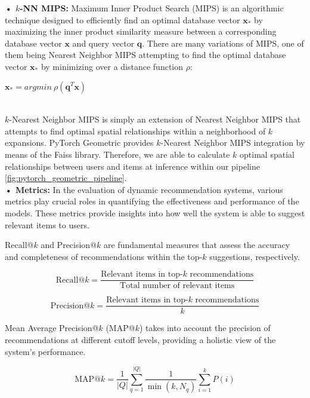 \documentclass[bst/sn-nature]{sn-jnl}
\begin{document}
\begin{multicols}{2}
\textbf{• $k$-NN MIPS:} Maximum Inner Product Search (MIPS) is an algorithmic technique designed to efficiently find an optimal database vector $\mathbf{x_{*}}$ by maximizing the inner product similarity measure between a corresponding database vector $\mathbf{x}$ and query vector $\mathbf{q}$. There are many variations of MIPS, one of them being Nearest Neighbor MIPS\cite{nnmips1, nnmips2} attempting to find the optimal database vector $\mathbf{x_{*}}$ by minimizing over a distance function $\rho$: \\ 

\begin{center}
    $\mathbf{x_{*}} = argmin \ \rho(\mathbf{q}^T \mathbf{x})$\\~\\
\end{center}

$k$-Nearest Neighbor MIPS\cite{nnmips3} is simply an extension of Nearest Neighbor MIPS that attempts to find optimal spatial relationships within a neighborhood of $k$ expansions.
PyTorch Geometric provides $k$-Nearest Neighbor MIPS\cite{nnmips3} integration by means of the Faiss library\cite{faiss}. Therefore, we are able to calculate $k$ optimal spatial relationships between users and items at inference within our pipeline \ref{fig:pytorch_geometric_pipeline}. \\ 

\textbf{• Metrics:} In the evaluation of dynamic recommendation systems, various metrics play crucial roles in quantifying the effectiveness and performance of the models. These metrics provide insights into how well the system is able to suggest relevant items to users. 

Recall@$k$ and Precision@$k$ are fundamental measures that assess the accuracy and completeness of recommendations within the top-$k$ suggestions, respectively. 

\[
\text{Recall@}k = \frac{\text{Relevant items in top-} k\text{ recommendations}}{\text{Total number of relevant items}}
\]

\[
\text{Precision@}k = \frac{\text{Relevant items in top-} k\text{ recommendations}}{k}
\]

Mean Average Precision@$k$ (MAP@$k$) takes into account the precision of recommendations at different cutoff levels, providing a holistic view of the system's performance. 

\[
\text{MAP@}k = \frac{1}{|Q|} \sum_{q=1}^{|Q|} \frac{1}{\min(k, N_q)} \sum_{i=1}^k P(i)
\] \\ 


\end{multicols}
\end{document}
